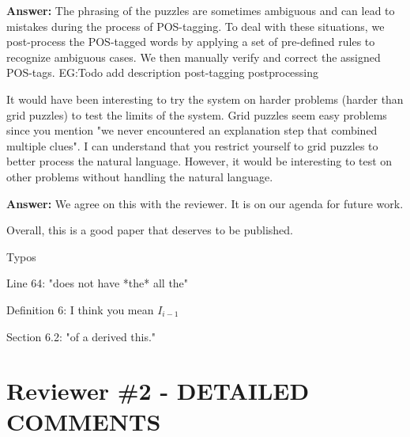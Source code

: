 \documentclass{article}
\newcommand\comment[1]{\marginpar{\tiny #1}}
\renewcommand\comment[1]{#1}
\newcommand{\tias}[1]{{\comment{\color{blue}\textsc{TG:}#1}}}
\newcommand{\emilio}[1]{{\comment{\color{red} \textsc{EG:}#1}}}
\newcommand{\answer}[1]{{\comment{\textbf{Answer:} #1}}}
\newcommand{\new}[1]{{\comment{{\color{blue} #1}}}}
\begin{document}
\answer{The phrasing of the puzzles are sometimes ambiguous and can lead to mistakes during the process of POS-tagging. To deal with these situations, we post-process the POS-tagged words by applying a set of pre-defined rules to recognize ambiguous cases. We then manually verify and correct the assigned POS-tags.}
\emilio{Todo add description post-tagging postprocessing} 

\begin{quoteit}
It would have been interesting to try the system on harder problems (harder than grid puzzles) to test the limits of the system.  Grid puzzles seem easy problems since you mention "we never encountered an explanation step that combined multiple clues".  I can understand that you restrict yourself to grid puzzles to better process the natural language. However, it would be interesting to test on other problems without handling the natural language.
\end{quoteit}

\answer{We agree on this with the reviewer. It is on our agenda for future work.}

\begin{quoteit}
Overall, this is a good paper that deserves to be published. 

Typos

Line 64: "does not have *the* all the"

Definition 6: I think you mean $I_{i-1}
$

Section 6.2: "of a derived this."
\end{quoteit}


\section*{Reviewer \#2 - DETAILED COMMENTS}
\end{document}

